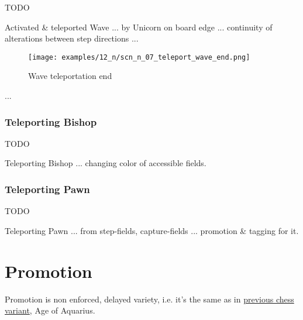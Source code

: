 \huge{TODO}
\normalsize{}

Activated \& teleported Wave ...
by Unicorn on board edge ...
continuity of alterations between step directions ...


\clearpage %

\noindent
\begin{figure}[!h]
\texttt{[image: examples/12\_n/scn\_n\_07\_teleport\_wave\_end.png]}
\caption{Wave teleportation end}
\label{fig:scn_n_07_teleport_wave_end}
\end{figure}

...

\clearpage %

\subsubsection*{Teleporting Bishop}

\huge{TODO}
\normalsize{}

Teleporting Bishop ... changing color of accessible fields.

\clearpage %

\subsubsection*{Teleporting Pawn}

\huge{TODO}
\normalsize{}

Teleporting Pawn ... from step-fields, capture-fields ... promotion \& tagging for it.

\clearpage %

\section*{Promotion}

Promotion is non enforced, delayed variety, i.e. it's the same as in
\hyperref[sec:Age of Aquarius/Promotion]{previous chess variant}, Age of Aquarius.


